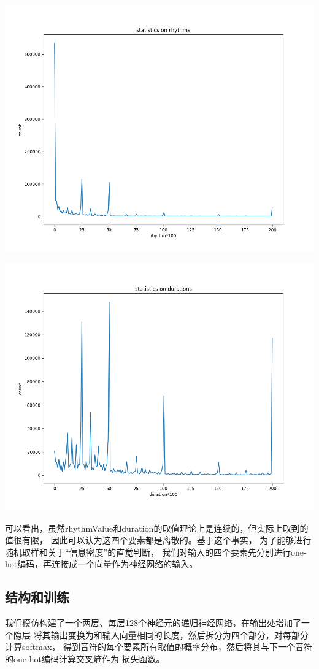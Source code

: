 \documentclass{article}
\begin{document}
    \includegraphics[width=.9\textwidth]{picture/rhythms.png}
    
    \includegraphics[width=.9\textwidth]{picture/durations.png}

    可以看出，虽然rhythmValue和duration的取值理论上是连续的，但实际上取到的值很有限，
    因此可以认为这四个要素都是离散的。基于这个事实，
    为了能够进行随机取样和关于“信息密度”的直觉判断，
    我们对输入的四个要素先分别进行one-hot编码，再连接成一个向量作为神经网络的输入。

  \subsection{结构和训练}
    我们模仿\cite{char-rnn-tensorflow}构建了一个两层、每层128个神经元的递归神经网络，在输出处增加了一个隐层
    将其输出变换为和输入向量相同的长度，然后拆分为四个部分，对每部分计算softmax，
    得到音符的每个要素所有取值的概率分布，然后将其与下一个音符的one-hot编码计算交叉熵作为
    损失函数。
\end{document}
